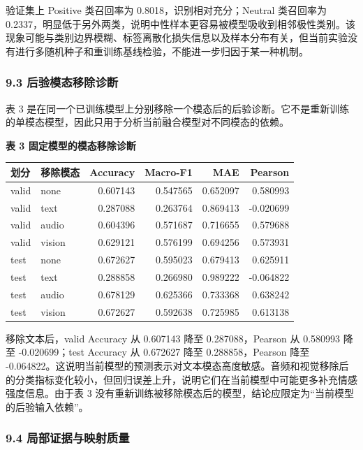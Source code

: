 \documentclass[
  12pt,
  a4paper,
]{ctexart}
\begin{document}
验证集上 Positive 类召回率为 0.8018，识别相对充分；Neutral 类召回率为
0.2337，明显低于另外两类，说明中性样本更容易被模型吸收到相邻极性类别。该现象可能与类别边界模糊、标签离散化损失信息以及样本分布有关，但当前实验没有进行多随机种子和重训练基线检验，不能进一步归因于某一种机制。

\hypertarget{ux540eux9a8cux6a21ux6001ux79fbux9664ux8bcaux65ad}{%
\subsubsection{9.3
后验模态移除诊断}\label{ux540eux9a8cux6a21ux6001ux79fbux9664ux8bcaux65ad}}

表 3
是在同一个已训练模型上分别移除一个模态后的后验诊断。它不是重新训练的单模态模型，因此只用于分析当前融合模型对不同模态的依赖。

\textbf{表 3 固定模型的模态移除诊断}

\begin{longtable}[]{@{}llrrrr@{}}
\toprule
划分 & 移除模态 & Accuracy & Macro-F1 & MAE & Pearson \\
\midrule
\endhead
valid & none & 0.607143 & 0.547565 & 0.652097 & 0.580993 \\
valid & text & 0.287088 & 0.263764 & 0.869413 & -0.020699 \\
valid & audio & 0.604396 & 0.571687 & 0.716655 & 0.579688 \\
valid & vision & 0.629121 & 0.576199 & 0.694256 & 0.573931 \\
test & none & 0.672627 & 0.595023 & 0.679413 & 0.625911 \\
test & text & 0.288858 & 0.266980 & 0.989222 & -0.064822 \\
test & audio & 0.678129 & 0.625366 & 0.733368 & 0.638242 \\
test & vision & 0.672627 & 0.592638 & 0.725985 & 0.613138 \\
\bottomrule
\end{longtable}

移除文本后，valid Accuracy 从 0.607143 降至 0.287088，Pearson 从
0.580993 降至 -0.020699；test Accuracy 从 0.672627 降至
0.288858，Pearson 降至
-0.064822。这说明当前模型的预测表示对文本模态高度敏感。音频和视觉移除后的分类指标变化较小，但回归误差上升，说明它们在当前模型中可能更多补充情感强度信息。由于表
3
没有重新训练被移除模态后的模型，结论应限定为``当前模型的后验输入依赖''。

\hypertarget{ux5c40ux90e8ux8bc1ux636eux4e0eux6620ux5c04ux8d28ux91cf}{%
\subsubsection{9.4
局部证据与映射质量}\label{ux5c40ux90e8ux8bc1ux636eux4e0eux6620ux5c04ux8d28ux91cf}}
\end{document}
